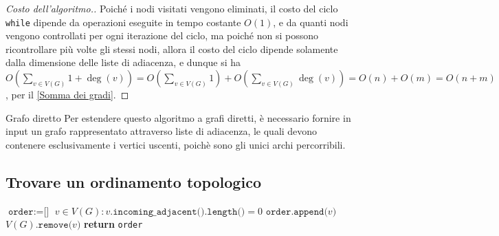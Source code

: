 \documentclass[a4paper, 12pt]{report}
\begin{document}
    \begin{proof}[Costo dell'algoritmo.]
        \label{costo findReachableNodes2}
        Poiché i nodi visitati vengono eliminati, il costo del ciclo \texttt{while} dipende da operazioni eseguite in tempo costante $O(1)$, e da quanti nodi vengono controllati per ogni iterazione del ciclo, ma poiché non si possono ricontrollare più volte gli stessi nodi, allora il costo del ciclo dipende solamente dalla dimensione delle liste di adiacenza, e dunque si ha $\displaystyle O\left( \sum_{v \in V(G)}{1 + \deg(v)}\right)=O\left(\sum_{v \in V(G)}{1}\right) + O\left(\sum_{v \in V(G)}{\deg(v)}\right) = O(n) + O(m) = O(n+ m)$, per il \cref{Somma dei gradi}.
    \end{proof}

    \begin{framedobs}{Grafo diretto}
        Per estendere questo algoritmo a grafi diretti, è necessario fornire in input un grafo rappresentato attraverso liste di adiacenza, le quali devono contenere esclusivamente i vertici uscenti, poichè sono gli unici archi percorribili.
    \end{framedobs}

    \subsection{Trovare un ordinamento topologico}

    \begin{algorithm}[H]
        \caption{
            Dato un grafo diretto aciclico $G$, l'algoritmo restituisce un suo ordinamento topologico.\\
            \textbf{Input}: $G$ grafo diretto aciclico.\\
            \textbf{Output}: un ordinamento topologico di $G$.
        }

        \begin{algorithmic}[1]
                \State $\texttt{order} := \texttt{[}\texttt{]}$
                    \State $v \in V(G) : v.\texttt{incoming\_adjacent().length()} = 0$
                    \State $\texttt{order.append(}v\texttt{)}$
                    \State $V(G)\texttt{.remove(}v\texttt{)}$
                \EndWhile
                \State \textbf{return} \texttt{order}
            \EndFunction
        \end{algorithmic}
    \end{algorithm}
\end{document}
